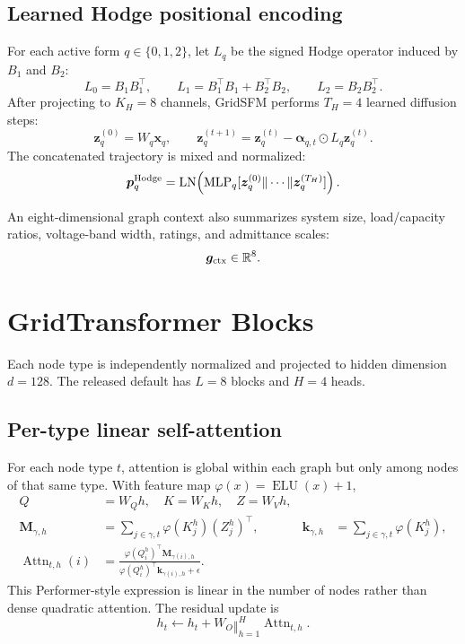 \documentclass[10pt]{article}
\newcommand{\R}{\mathbb{R}}
\newcommand{\LN}{\operatorname{LN}}
\newcommand{\MLP}{\operatorname{MLP}}
\begin{document}
\subsection{Learned Hodge positional encoding}

For each active form \(q\in\{0,1,2\}\), let \(L_q\) be the signed Hodge
operator induced by \(B_1\) and \(B_2\):
\begin{equation}
 L_0=B_1B_1^\top,\qquad
 L_1=B_1^\top B_1+B_2^\top B_2,\qquad
 L_2=B_2B_2^\top.
\end{equation}
After projecting to \(K_H=8\) channels, GridSFM performs \(T_H=4\) learned
diffusion steps:
\begin{equation}
 \bm z_q^{(0)}=W_q\bm x_q,\qquad
 \bm z_q^{(t+1)}=\bm z_q^{(t)}-\bm\alpha_{q,t}\odot L_q\bm z_q^{(t)}.
\end{equation}
The concatenated trajectory is mixed and normalized:
\begin{equation}
 \bm p_q^{\rm Hodge}=\LN\!\left(\MLP_q
 [\bm z_q^{(0)}\Vert\cdots\Vert\bm z_q^{(T_H)}]\right).
\end{equation}

An eight-dimensional graph context also summarizes system size, load/capacity
ratios, voltage-band width, ratings, and admittance scales:
\begin{equation}
 \bm g_{\rm ctx}\in\R^8.
\end{equation}

\section{GridTransformer Blocks}

Each node type is independently normalized and projected to hidden dimension
\(d=128\). The released default has \(L=8\) blocks and \(H=4\) heads.

\subsection{Per-type linear self-attention}

For each node type \(t\), attention is global within each graph but only among
nodes of that same type. With feature map \(\varphi(x)=\operatorname{ELU}(x)+1\),
\begin{align}
 Q&=W_Qh,\quad K=W_Kh,\quad Z=W_Vh,\\
 \bm M_{\gamma,h}&=\sum_{j\in\gamma,t}\varphi(K_j^h)(Z_j^h)^\top,
 &\bm k_{\gamma,h}&=\sum_{j\in\gamma,t}\varphi(K_j^h),\\
 \operatorname{Attn}_{t,h}(i)&=
 \frac{\varphi(Q_i^h)^\top\bm M_{\gamma(i),h}}
 {\varphi(Q_i^h)^\top\bm k_{\gamma(i),h}+\epsilon}.
\end{align}
This Performer-style expression is linear in the number of nodes rather than
dense quadratic attention. The residual update is
\begin{equation}
 h_t\leftarrow h_t+W_O\mathop{\Vert}_{h=1}^{H}\operatorname{Attn}_{t,h}.
\end{equation}
\end{document}
